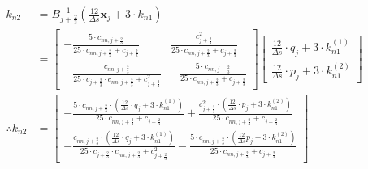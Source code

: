 \documentclass{article}
\begin{document}
\begin{align*}
	k_{n2}            & = B_{j+\frac{2}{3}}^{-1}\left(\frac{12}{\Delta s}\bm{x}_j + 3\cdot k_{n1} \right)                                                                                                                                                                                                                                                                                                                                                                                                                                                                                                                                                                                                                                                                                                                                                                                                                                                          \\
	                  & = \begin{bmatrix} -\frac{5\cdot c_{nn, j+\frac{2}{3}}}{25\cdot c_{nn, j+\frac{2}{3}} + c_{j+\frac{2}{3}}} & \frac{c^2_{j+\frac{2}{3}}}{25\cdot c_{nn, j+\frac{2}{3}} + c_{j+\frac{2}{3}}}  \\ -\frac{c_{nn, j+\frac{2}{3}}}{25\cdot c_{j+\frac{2}{3}}\cdot c_{nn, j+\frac{2}{3}} + c_{j+\frac{2}{3}}^2} & -\frac{5\cdot c_{nn, j+\frac{2}{3}}}{25\cdot c_{nn, j+\frac{2}{3}} + c_{j+\frac{2}{3}}} \end{bmatrix}\begin{bmatrix} \frac{12}{\Delta s} \cdot q_j + 3\cdot k_{n1}^{(1)} \\ \frac{12}{\Delta s} \cdot p_j + 3\cdot k_{n1}^{(2)} \end{bmatrix}                                                                                                                                                                                                                                        \\
	\therefore k_{n2} & = \begin{bmatrix} -\frac{5\cdot c_{nn, j+\frac{2}{3}}\cdot\left(\frac{12}{\Delta s} \cdot q_j + 3\cdot k_{n1}^{(1)} \right)}{25\cdot c_{nn, j+\frac{2}{3}} + c_{j+\frac{2}{3}}} + \frac{c^2_{j+\frac{2}{3}}\cdot\left(\frac{12}{\Delta s} \cdot p_j + 3\cdot k_{n1}^{(2)}  \right)}{25\cdot c_{nn, j+\frac{2}{3}} + c_{j+\frac{2}{3}}}  \\ -\frac{c_{nn, j+\frac{2}{3}}\cdot\left(\frac{12}{\Delta s} \cdot q_j + 3\cdot k_{n1}^{(1)} \right)}{25\cdot c_{j+\frac{2}{3}}\cdot c_{nn, j+\frac{2}{3}} + c_{j+\frac{2}{3}}^2} - \frac{5\cdot c_{nn, j+\frac{2}{3}}\cdot \left(\frac{12}{\Delta s}p_j + 3\cdot k_{n1}^{(2)}  \right)}{25\cdot c_{nn, j+\frac{2}{3}} + c_{j+\frac{2}{3}}} \end{bmatrix}
\end{align*}
\end{document}
